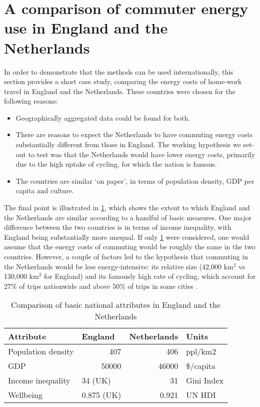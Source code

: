 \section{A comparison of commuter energy use in England and the Netherlands}
\label{sinternational}
In order to demonstrate that the methods can be used internationally,
this section provides a short case study, comparing the energy costs
of home-work travel in England and the Netherlands. These countries
were chosen for the following reasons:
\begin{itemize}
 \item Geographically aggregated data could be found for both.
 \item There are reasons to expect the Netherlands to have commuting energy costs
 substantially different from those in England. The working hypothesis we
 set-out to test was that the Netherlands would have lower energy costs, primarily
 due to the high uptake of cycling, for which the nation is famous.
 \item The countries are similar `on paper', in terms of population density,
 GDP per capita and culture.
\end{itemize}
The final point is illustrated in \cref{tcompare}, which shows the extent to
which England and the Netherlands are similar according to a handful of basic
measures. One major difference between the two countries is in terms of
income inequality, with England being substantially more unequal.
If only \cref{tcompare} were considered, one would assume that the energy
costs of commuting would be roughly the same in the two countries. However,
a couple of factors led to the hypothesis that commuting in the Netherlands
would be less energy-intensive: its relative size (42,000 km$^2$ vs 130,000 km$^2$
for England) and its famously high rate of cycling, which account for
27\% of trips nationwide and above 50\% of trips in some cities
\citep{Pucher2008}.

\begin{table}[htbp]
\caption{Comparison of basic national attributes in England and the Netherlands}
\begin{center}
\begin{tabular}{llrl}
\toprule
Attribute & England & \multicolumn{1}{l}{Netherlands } & Units \\
\midrule
Population density & \multicolumn{1}{r}{407} & 406 & ppl/km2 \\
GDP & \multicolumn{1}{r}{50000} & 46000 & \$/capita \\
Income inequality & 34 (UK) & 31 & Gini Index \\
Wellbeing & 0.875 (UK) & 0.921 & UN HDI \\
\bottomrule
\end{tabular}\end{center}
\label{tcompare}
\end{table}


